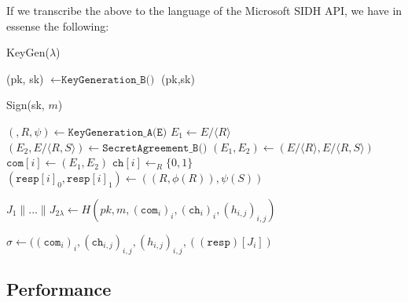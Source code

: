If we transcribe the above to the language of the Microsoft SIDH API, we have in essense the following:\\

\begin{algorithm}
\caption{KeyGen($\lambda$)}\label{euclid}
\begin{algorithmic}[1]
\State (pk, sk) $\gets \texttt{KeyGeneration\_B()}$
\State \Return (pk,sk)
\end{algorithmic}
\end{algorithm}

\begin{algorithm}
\caption{Sign(sk, $m$)}\label{euclid}
\begin{algorithmic}[1]
	\State $(, R, \psi) \gets \texttt{KeyGeneration\_A(E)}$
	\State $E_{1} \gets E/\langle R \rangle$
	\State $(E_{2},E/\langle R,S \rangle) \gets \texttt{SecretAgreement\_B()}$
	\State $(E_{1},E_{2}) \gets (E/\langle R \rangle, E/\langle R,S \rangle)$
	\State $\texttt{com}[i] \gets (E_{1}, E_{2})$
	\State $\texttt{ch}[i] \gets_{R} \{0,1\}$
	\State $(\texttt{resp}[i]_{0}, \texttt{resp}[i]_{1}) \gets ((R,\phi(R)), \psi(S))$
	
\EndFor

\State $J_{1} \parallel ... \parallel J_{2\lambda} \gets H(pk, m, (\texttt{com}_{i})_{i},(\texttt{ch}_{i})_{i},(h_{i,j})_{i,j})$

\State \Return $\sigma \gets ((\texttt{com}_{i})_{i}, (\texttt{ch}_{i,j})_{i,j}, (h_{i,j})_{i,j}, ((\texttt{resp})[J_{i}])$
\end{algorithmic}
\end{algorithm}

\subsection{Performance}

